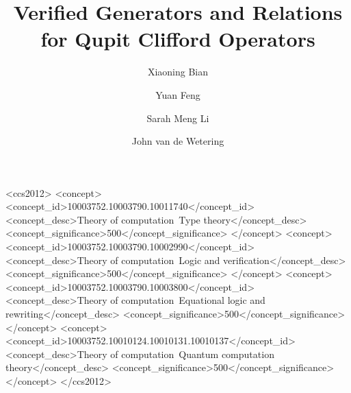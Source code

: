 \documentclass[acmsmall,review,anonymous]{acmart}
\begin{document}
\title{Verified Generators and Relations for Qupit Clifford Operators}

\author{Xiaoning Bian}

\author{Yuan Feng}

\author{Sarah Meng Li}

\author{John van de Wetering}

\begin{abstract}

\end{abstract}

\begin{CCSXML}
<ccs2012>
<concept>
<concept_id>10003752.10003790.10011740</concept_id>
<concept_desc>Theory of computation~Type theory</concept_desc>
<concept_significance>500</concept_significance>
</concept>
<concept>
<concept_id>10003752.10003790.10002990</concept_id>
<concept_desc>Theory of computation~Logic and verification</concept_desc>
<concept_significance>500</concept_significance>
</concept>
<concept>
<concept_id>10003752.10003790.10003800</concept_id>
<concept_desc>Theory of computation~Equational logic and rewriting</concept_desc>
<concept_significance>500</concept_significance>
</concept>
<concept>
<concept_id>10003752.10010124.10010131.10010137</concept_id>
<concept_desc>Theory of computation~Quantum computation theory</concept_desc>
<concept_significance>500</concept_significance>
</concept>
</ccs2012>
\end{CCSXML}


\maketitle
\end{document}
